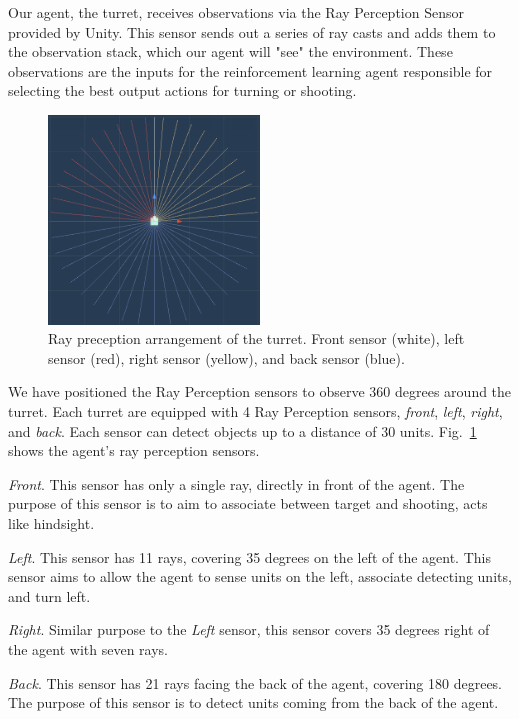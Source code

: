 \documentclass[conference]{IEEEtran}
\begin{document}
Our agent, the turret, receives observations via the Ray Perception Sensor provided by Unity. This sensor sends out a series of ray casts and adds them to the observation stack, which our agent will "see" the environment. These observations are the inputs for the reinforcement learning agent responsible for selecting the best output actions for turning or shooting. 

\begin{figure}[h]
\centerline{\includegraphics[width=0.5\textwidth]{assets/agent_sensor_2}}
\caption{Ray preception arrangement of the turret. Front sensor (white), left sensor (red), right sensor (yellow), and back sensor (blue).}
\label{agent_sensor}
\end{figure}

We have positioned the Ray Perception sensors to observe 360 degrees around the turret. Each turret are equipped with 4 Ray Perception sensors, \textit{front}, \textit{left}, \textit{right}, and \textit{back}. Each sensor can detect objects up to a distance of 30 units. Fig.~\ref{agent_sensor} shows the agent's ray perception sensors.

\textit{Front}. This sensor has only a single ray, directly in front of the agent. The purpose of this sensor is to aim to associate between target and shooting, acts like hindsight.

\textit{Left}. This sensor has 11 rays, covering 35 degrees on the left of the agent. This sensor aims to allow the agent to sense units on the left, associate detecting units, and turn left.

\textit{Right}. Similar purpose to the \textit{Left} sensor, this sensor covers 35 degrees right of the agent with seven rays.

\textit{Back}. This sensor has 21 rays facing the back of the agent, covering 180 degrees. The purpose of this sensor is to detect units coming from the back of the agent.
\end{document}
